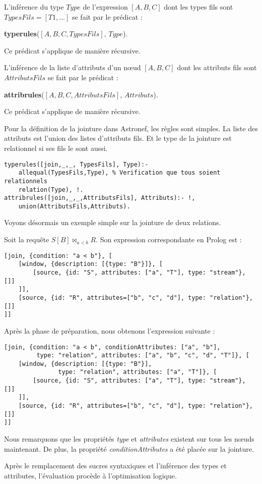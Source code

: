 \begin{regle}
L'inférence du type $Type$ de l'expression $[A,B,C]$ dont les types fils sont $TypesFils=[T1,...]$ se fait par le prédicat :
\begin{center} \textbf{typerules}($[A,B,C,TypesFils]$, $Type$).\end{center}
Ce prédicat s'applique de manière récursive.
\end{regle}

\begin{regle}
L'inférence de la liste d'attributs d'un nœud $[A,B,C]$ dont les attributs fils sont $AttributsFils$ se fait par le prédicat :
\begin{center} \textbf{attribrules}($[A,B,C,AttributsFils]$, $Attributs$).\end{center}
Ce prédicat s'applique de manière récursive.
\end{regle}

\begin{example}
	Pour la définition de la jointure dans Astronef, les règles sont simples. La liste des attributs est l'union des listes d'attributs fils. Et le type de la jointure est relationnel si ses fils le sont aussi.
	\begin{lstlisting}
typerules([join,_,_, TypesFils], Type):- 
	allequal(TypesFils,Type), % Verification que tous soient relationnels 
	relation(Type), !.
attribrules([join,_,_,AttributsFils], Attributs):- !, 
	union(AttributsFils,Attributs).
	\end{lstlisting}
\end{example}

Voyons désormais un exemple simple sur la jointure de deux relations.
\begin{example}
	Soit la requête $S[B] \Join_{a < b} R$. Son expression correspondante en Prolog est :
	\begin{lstlisting}
[join, {condition: "a < b"}, [
	[window, {description: [{type: "B"}]}, [
		[source, {id: "S", attributes: ["a", "T"], type: "stream"}, []]
	]],
	[source, {id: "R", attributes=["b", "c", "d"], type: "relation"}, []]
]]
	\end{lstlisting}
	Après la phase de préparation, nous obtenons l'expression suivante :
	\begin{lstlisting}
[join, {condition: "a < b", conditionAttributes: ["a", "b"], 
		 type: "relation", attributes: ["a", "b", "c", "d", "T"]}, [
	[window, {description: [{type: "B"}], 
			   type: "relation", attributes: ["a", "T"]}, [
		[source, {id: "S", attributes: ["a", "T"], type: "stream"}, []]
	]],
	[source, {id: "R", attributes=["b", "c", "d"], type: "relation"}, []]
]]
	\end{lstlisting}
	Nous remarquons que les propriétés \textit{type} et \textit{attributes} existent sur tous les nœuds maintenant. De plus, la propriété \textit{conditionAttributes} a été placée sur la jointure.
\end{example}
Après le remplacement des sucres syntaxiques et l'inférence des types et attributes, l'évaluation procède à l'optimisation logique.